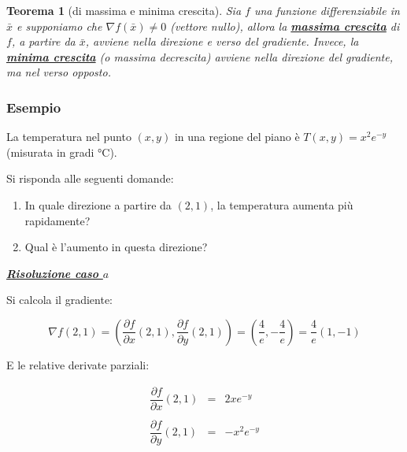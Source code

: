 \documentclass[a4paper]{article}
\newtheorem{theorem}{Teorema}
\begin{document}
	\begin{theorem}[di massima e minima crescita]
		Sia $f$ una funzione differenziabile in $\bar{x}$ e supponiamo che $\nabla f\left(\bar{x}\right) \ne 0$ (vettore nullo), allora la \textcolor{Red3}{\textbf{\underline{massima crescita}}} di $f$, a partire da $\bar{x}$, avviene nella direzione e verso del gradiente. Invece, la \textcolor{Red3}{\textbf{\underline{minima crescita}}} (o massima decrescita) avviene nella direzione del gradiente, ma nel verso opposto.
	\end{theorem}
	
	\subsubsection[Esempio]{\textcolor{Green4}{Esempio}}
	
	La temperatura nel punto $\left(x,y\right)$ in una regione del piano è $T\left(x,y\right) = x^{2} e^{-y}$ (misurata in gradi °C).\newline
	
	\noindent
	Si risponda alle seguenti domande:
	
	\begin{enumerate}[label=\alph*)]
		\item In quale direzione a partire da $\left(2,1\right)$, la temperatura aumenta più rapidamente?
		\item Qual è l'aumento in questa direzione?
	\end{enumerate}

	\noindent
	\textcolor{Green4}{\textbf{\emph{\underline{Risoluzione caso $a$}}}}\newline
	
	\noindent
	Si calcola il gradiente:
	
	\begin{equation*}
		\nabla f\left(2,1\right) = \left(\dfrac{\partial f}{\partial x}\left(2,1\right), \dfrac{\partial f}{\partial y}\left(2,1\right)\right) = \left(\dfrac{4}{e}, -\dfrac{4}{e}\right) = \dfrac{4}{e}\left(1,-1\right)
	\end{equation*}

	\noindent
	E le relative derivate parziali:
	
	\begin{equation*}
		\begin{array}{lll}
			\dfrac{\partial f}{\partial x}\left(2,1\right) & = & 2x e^{-y} \\
			&& \\
			\dfrac{\partial f}{\partial y}\left(2,1\right) & = & -x^{2} e^{-y}
		\end{array}
	\end{equation*}
	
\end{document}
